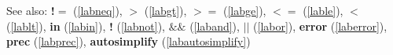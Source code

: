 See also: \textbf{!$=$} (\ref{labneq}), \textbf{$>$} (\ref{labgt}), \textbf{$>=$} (\ref{labge}), \textbf{$<=$} (\ref{lable}), \textbf{$<$} (\ref{lablt}), \textbf{in} (\ref{labin}), \textbf{!} (\ref{labnot}), \textbf{$\&\&$} (\ref{laband}), \textbf{$||$} (\ref{labor}), \textbf{error} (\ref{laberror}), \textbf{prec} (\ref{labprec}), \textbf{autosimplify} (\ref{labautosimplify})
